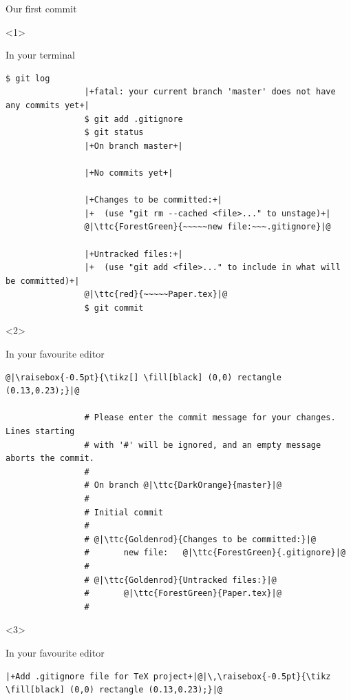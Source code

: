 \documentclass[usenames,svgnames,14pt]{beamer}
\newcommand{\ttc}[2]{\texttt{\textcolor{#1}{#2}}}
\begin{document}
\begin{frame}[fragile]{Our first commit}
    \vspace{-0.09\textheight}
    \begin{overlayarea}{\textwidth}{0.7\textheight}
        \begin{onlyenv}<1>
            \centerline{In your terminal}
            \begin{lstlisting}[style=MyBash, aboveskip=2mm, xleftmargin=-1mm, xrightmargin=-1mm]
                $ git log
                |+fatal: your current branch 'master' does not have any commits yet+|
                $ git add .gitignore
                $ git status
                |+On branch master+|

                |+No commits yet+|

                |+Changes to be committed:+|
                |+  (use "git rm --cached <file>..." to unstage)+|
                @|\ttc{ForestGreen}{~~~~~new file:~~~.gitignore}|@

                |+Untracked files:+|
                |+  (use "git add <file>..." to include in what will be committed)+|
                @|\ttc{red}{~~~~~Paper.tex}|@
                $ git commit
            \end{lstlisting}
        \end{onlyenv}
        \begin{onlyenv}<2>
            \centerline{In your favourite editor}
            \begin{lstlisting}[style=MyBash, aboveskip=2mm, xleftmargin=-3mm, xrightmargin=-3mm]
                @|\raisebox{-0.5pt}{\tikz[] \fill[black] (0,0) rectangle (0.13,0.23);}|@

                # Please enter the commit message for your changes. Lines starting
                # with '#' will be ignored, and an empty message aborts the commit.
                #
                # On branch @|\ttc{DarkOrange}{master}|@
                #
                # Initial commit
                #
                # @|\ttc{Goldenrod}{Changes to be committed:}|@
                #       new file:   @|\ttc{ForestGreen}{.gitignore}|@
                #
                # @|\ttc{Goldenrod}{Untracked files:}|@
                #       @|\ttc{ForestGreen}{Paper.tex}|@
                #
            \end{lstlisting}
        \end{onlyenv}
        \begin{onlyenv}<3>
            \centerline{In your favourite editor}
            \begin{lstlisting}[style=MyBash, aboveskip=2mm, xleftmargin=-3mm, xrightmargin=-3mm]
                |+Add .gitignore file for TeX project+|@|\,\raisebox{-0.5pt}{\tikz \fill[black] (0,0) rectangle (0.13,0.23);}|@


\end{lstlisting}
\end{onlyenv}
\end{overlayarea}
\end{frame}
\end{document}
